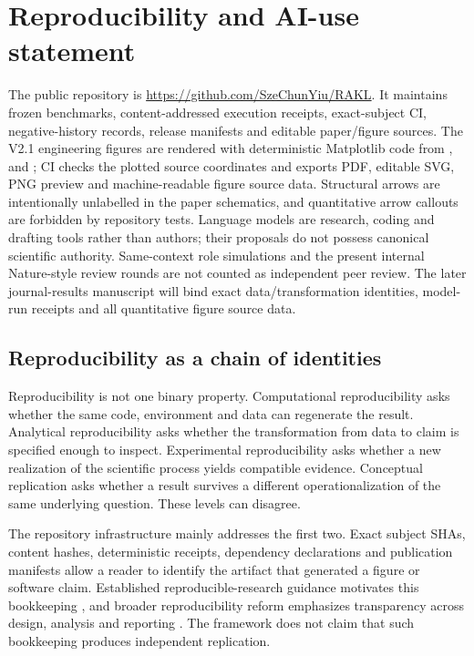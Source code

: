 \section*{Reproducibility and AI-use statement}
The public repository is \url{https://github.com/SzeChunYiu/RAKL}. It maintains frozen benchmarks, content-addressed execution receipts, exact-subject CI, negative-history records, release manifests and editable paper/figure sources. The V2.1 engineering figures are rendered with deterministic Matplotlib code from ,  and ; CI checks the plotted source coordinates and exports PDF, editable SVG, PNG preview and machine-readable figure source data. Structural arrows are intentionally unlabelled in the paper schematics, and quantitative arrow callouts are forbidden by repository tests. Language models are research, coding and drafting tools rather than authors; their proposals do not possess canonical scientific authority. Same-context role simulations and the present internal Nature-style review rounds are not counted as independent peer review. The later journal-results manuscript will bind exact data/transformation identities, model-run receipts and all quantitative figure source data.

\appendix
\subsection{Reproducibility as a chain of identities}

Reproducibility is not one binary property. Computational reproducibility asks whether the same code, environment and data can regenerate the result. Analytical reproducibility asks whether the transformation from data to claim is specified enough to inspect. Experimental reproducibility asks whether a new realization of the scientific process yields compatible evidence. Conceptual replication asks whether a result survives a different operationalization of the same underlying question. These levels can disagree.

The repository infrastructure mainly addresses the first two. Exact subject SHAs, content hashes, deterministic receipts, dependency declarations and publication manifests allow a reader to identify the artifact that generated a figure or software claim. Established reproducible-research guidance motivates this bookkeeping \cite{sandve2013,wilson2017}, and broader reproducibility reform emphasizes transparency across design, analysis and reporting \cite{munafo2017}. The framework does not claim that such bookkeeping produces independent replication.

